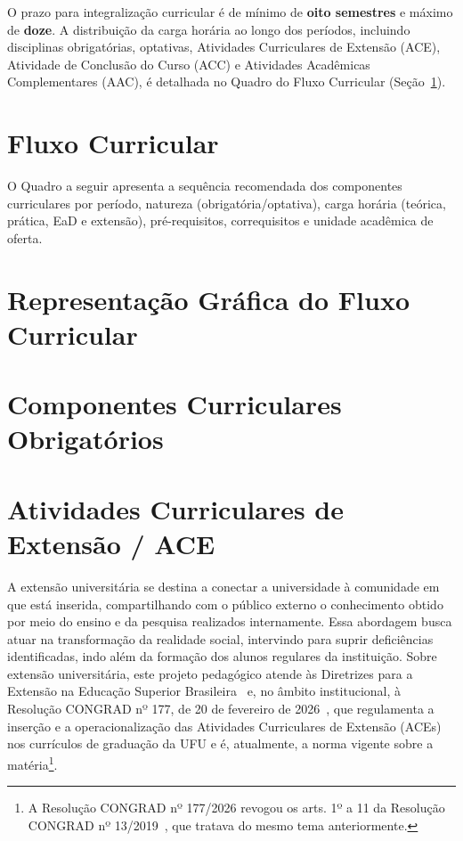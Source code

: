 O prazo para integralização curricular é de mínimo de \textbf{oito semestres} e máximo de \textbf{doze}. A distribuição da carga horária ao longo dos períodos, incluindo disciplinas obrigatórias, optativas, Atividades Curriculares de Extensão (ACE), Atividade de Conclusão do Curso (ACC) e Atividades Acadêmicas Complementares (AAC), é detalhada no Quadro do Fluxo Curricular (Seção~\ref{sec:fluxo}).

\section{Fluxo Curricular}
\label{sec:fluxo}

O Quadro a seguir apresenta a sequência recomendada dos componentes curriculares por período, natureza (obrigatória/optativa), carga horária (teórica, prática, EaD e extensão), pré-requisitos, correquisitos e unidade acadêmica de oferta.



\newpage
\section{Representação Gráfica do Fluxo Curricular}

\begin{landscape}

\end{landscape}

\newpage
\section{Componentes Curriculares Obrigatórios}


\section{Atividades Curriculares de Extensão / ACE}

A extensão universitária se destina a conectar a universidade à comunidade em que está inserida, compartilhando com o público externo o conhecimento obtido por meio do ensino e da pesquisa realizados internamente. Essa abordagem busca atuar na transformação da realidade social, intervindo para suprir deficiências identificadas, indo além da formação dos alunos regulares da instituição. Sobre extensão universitária, este projeto pedagógico atende às Diretrizes para a Extensão na Educação Superior Brasileira~\cite{cne_ces_7_2018} e, no âmbito institucional, à Resolução CONGRAD nº 177, de 20 de fevereiro de 2026~\cite{ufu_congrad_177_2026}, que regulamenta a inserção e a operacionalização das Atividades Curriculares de Extensão (ACEs) nos currículos de graduação da UFU e é, atualmente, a norma vigente sobre a matéria\footnote{A Resolução CONGRAD nº 177/2026 revogou os arts. 1º a 11 da Resolução CONGRAD nº 13/2019~\cite{ufu_congrad_13_2019}, que tratava do mesmo tema anteriormente.}.

